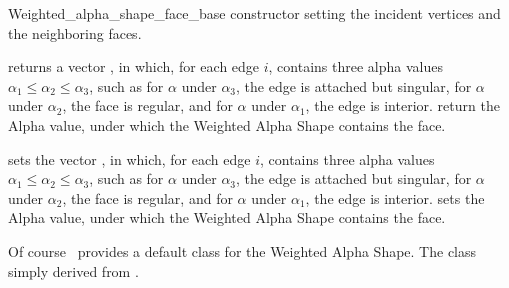 \begin{ccClass}{Weighted_alpha_shape_face_base}
\ccCreation
{}
\ccGlue
{}
\ccGlue
{} 
{constructor setting the incident vertices and the neighboring faces.}

{returns a vector , in which, for each edge $i$,  contains three alpha values $\alpha_1 \leq \alpha_2 \leq \alpha_3$, such as for
$\alpha$ under $\alpha_3$, the edge is attached but singular,
for $\alpha$ under $\alpha_2$, the face is regular, and for $\alpha$
under $\alpha_1$, the edge is interior.}
{return the Alpha value, under which the Weighted Alpha Shape contains the
face.}

\ccModifiers
{}
{sets the vector , in which, for each edge $i$,  contains three alpha values $\alpha_1 \leq \alpha_2 \leq \alpha_3$, such as for
$\alpha$ under $\alpha_3$, the edge is attached but singular,
for $\alpha$ under $\alpha_2$, the face is regular, and for $\alpha$
under $\alpha_1$, the edge is interior.}
{sets the Alpha value, under which the Weighted Alpha Shape contains the
face.}

\end{ccClass}


Of course  \cgal\ provides a default  class
for the Weighted Alpha Shape. The class
 simply derived from 
.

